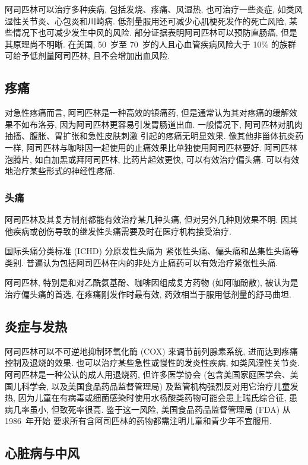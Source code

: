 阿司匹林可以治疗多种疾病,
包括发烧、疼痛、风湿热,
也可治疗一些炎症,
如类风湿性关节炎、心包炎和川崎病.
低剂量服用还可减少心肌梗死发作的死亡风险,
某些情况下也可减少发生中风的风险.
部分证据表明阿司匹林可以预防直肠癌,
但是其原理尚不明晰.
在美国, 50~岁至 70~岁的人且心血管疾病风险大于 10\% 的族群%
可给予低剂量阿司匹林, 且不会增加出血风险.

\subsection{疼痛}

对急性疼痛而言, 阿司匹林是一种高效的镇痛药,
但是通常认为其对疼痛的缓解效果不如布洛芬,
因为阿司匹林更容易引发胃肠道出血.
一般情况下, 阿司匹林对肌肉抽搐、腹胀、胃扩张和急性皮肤刺激%
引起的疼痛无明显效果.
像其他非甾体抗炎药一样,
阿司匹林与咖啡因一起使用的止痛效果比单独使用阿司匹林要好.
阿司匹林泡腾片,
如白加黑或拜阿司匹林, 比药片起效更快,
可以有效治疗偏头痛.
可以有效地治疗某些形式的神经性疼痛.

\subsubsection{头痛}

阿司匹林及其复方制剂都能有效治疗某几种头痛,
但对另外几种则效果不明.
因其他疾病或创伤导致的继发性头痛需要及时在医疗机构接受治疗.

国际头痛分类标准 (ICHD) 分原发性头痛为%
紧张性头痛、偏头痛和丛集性头痛等类别.
普遍认为包括阿司匹林在内的非处方止痛药可以有效治疗紧张性头痛.

阿司匹林,
特别是和对乙酰氨基酚、咖啡因组成复方药物 (如阿咖酚散),
被认为是治疗偏头痛的首选,
在疼痛刚发作时最有效,
药效相当于服用低剂量的舒马曲坦.

\subsection{炎症与发热}

阿司匹林可以不可逆地抑制环氧化酶 (COX) 来调节前列腺素系统,
进而达到疼痛控制及退烧的效果.
也可以治疗某些急性或慢性的发炎性疾病, 如类风湿性关节炎.
阿司匹林是一种公认的成人用退烧药,
但许多医学协会
(包含美国家庭医学会、美国儿科学会, 以及美国食品药品监督管理局)
及监管机构强烈反对用它治疗儿童发热,
因为儿童在有病毒或细菌感染时使用水杨酸类药物可能会患上瑞氏综合征,
患病几率虽小, 但致死率很高.
鉴于这一风险,
美国食品药品监督管理局 (FDA) 从1986~年开始%
要求所有含阿司匹林的药物都需注明儿童和青少年不宜服用.

\subsection{心脏病与中风}

